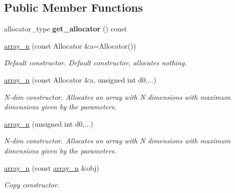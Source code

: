 \subsection*{Public Member Functions}
\begin{DoxyCompactItemize}
\item 
\mbox{\label{classsisl_1_1array__n_a5016fdf6f7a7e6eea1b519b938c3e8c6}} 
allocator\+\_\+type {\bfseries get\+\_\+allocator} () const
\item 
\mbox{\label{classsisl_1_1array__n_acf5287e20ac20856d3ce1af561d3d02a}} 
\hyperlink{classsisl_1_1array__n_acf5287e20ac20856d3ce1af561d3d02a}{array\+\_\+n} (const Allocator \&a=Allocator())
\begin{DoxyCompactList}\small\item\em Default constructor. Default constructor, allocates nothing. \end{DoxyCompactList}\item 
\mbox{\label{classsisl_1_1array__n_ab37d133a8c067cdaf8063ba49205fdea}} 
\hyperlink{classsisl_1_1array__n_ab37d133a8c067cdaf8063ba49205fdea}{array\+\_\+n} (const Allocator \&a, unsigned int d0,...)
\begin{DoxyCompactList}\small\item\em N-\/dim constructor. Allocates an array with N dimensions with maximum dimensions given by the parameters. \end{DoxyCompactList}\item 
\mbox{\label{classsisl_1_1array__n_a014fd246834441f65441e88d298fc839}} 
\hyperlink{classsisl_1_1array__n_a014fd246834441f65441e88d298fc839}{array\+\_\+n} (unsigned int d0,...)
\begin{DoxyCompactList}\small\item\em N-\/dim constructor. Allocates an array with N dimensions with maximum dimensions given by the parameters. \end{DoxyCompactList}\item 
\mbox{\label{classsisl_1_1array__n_a5e645e1a620903d12e4d00f99d58622c}} 
\hyperlink{classsisl_1_1array__n_a5e645e1a620903d12e4d00f99d58622c}{array\+\_\+n} (const \hyperlink{classsisl_1_1array__n}{array\+\_\+n} \&obj)
\begin{DoxyCompactList}\small\item\em Copy constructor. \end{DoxyCompactList}\item 

\end{DoxyCompactItemize}

